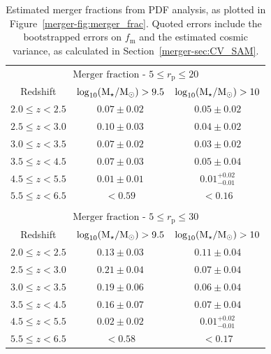 \begin{table}
  \caption[Estimated merger fractions from PDF analysis, as plotted in Figure~\ref{merger-fig:merger_frac}.]{Estimated merger fractions from PDF analysis, as plotted in Figure~\ref{merger-fig:merger_frac}. Quoted errors include the bootstrapped errors on $f_{\text{m}}$ and the estimated cosmic variance, as calculated in Section~\ref{merger-sec:CV_SAM}.}
\centering
  \begin{tabular}{c|cc}
   \multicolumn{3}{c}{$\text{Merger~fraction}$ - $5 \leq r_{\text{p}} \leq 20$} \\ \noalign{\smallskip}
   Redshift  & $\log_{10}(\text{M}_{\star} / \text{M}_{\odot}) > 9.5$ & $\log_{10}(\text{M}_{\star} / \text{M}_{\odot}) > 10$ \\
    \hline
   $2.0 \leq z < 2.5$ & $0.07 \pm 0.02$ & $0.05 \pm 0.02$\\
   $2.5 \leq z < 3.0$ & $0.10 \pm 0.03$&  $0.04 \pm 0.02$\\
   $3.0 \leq z < 3.5$ & $0.07 \pm 0.02$&  $0.03 \pm 0.02$ \\
   $3.5 \leq z < 4.5$ & $0.07 \pm 0.03$&  $0.05 \pm 0.04$\\
   $4.5 \leq z < 5.5$ & $0.01 \pm 0.01$&  $0.01^{+0.02}_{-0.01}$\\
   $5.5 \leq z < 6.5$ & $<  0.59$&  $< 0.16$\\  
    & & \\
    
   \multicolumn{3}{c}{$\text{Merger~fraction}$ - $5 \leq r_{\text{p}} \leq 30$} \\ \noalign{\smallskip}
   Redshift & $\log_{10}(\text{M}_{\star} / \text{M}_{\odot}) > 9.5$ & $\log_{10}(\text{M}_{\star} / \text{M}_{\odot}) > 10$ \\
    \hline
   $2.0 \leq z < 2.5$ & $0.13 \pm 0.03$ & $0.11 \pm 0.04$\\
   $2.5 \leq z < 3.0$ & $0.21 \pm 0.04$&  $0.07 \pm 0.04$\\
   $3.0 \leq z < 3.5$ & $0.19 \pm 0.06$&  $0.06 \pm 0.04$ \\
   $3.5 \leq z < 4.5$ & $0.16 \pm 0.07$&  $0.07 \pm 0.04$\\
   $4.5 \leq z < 5.5$ & $0.02 \pm 0.02$&  $0.01^{+0.02}_{-0.01}$\\
   $5.5 \leq z < 6.5$ & $<  0.58$&  $< 0.17$\\  
    
  \end{tabular}\label{tab:fmerger}
\end{table}

